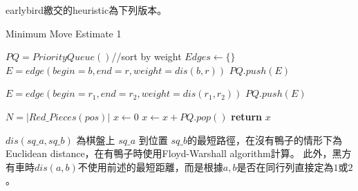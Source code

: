 \documentclass[a4paper, 12pt]{article}  %
\begin{document}
earlybird繳交的heuristic為下列版本。
\begin{algorithm}
\caption{Minimum Move Estimate 1}
\label{alg:min_move_estimate1}
    \begin{algorithmic}[1] %
        \State $PQ=PriorityQueue()$//sort by weight
        \State $Edges\gets \{\}$
                    \State$E=edge(begin=b,end=r,weight=dis(b,r))$
                    \State$PQ.push( E )$
                \EndIf
            \EndFor
        \EndFor


                \State$E=edge(begin=r_1,end=r_2,weight=dis(r_1,r_2))$
                \State$PQ.push( E )$
            \EndFor
        \EndFor
        
        \State$N = |Red\_Pieces(pos)|$
        \State $x\gets 0$
            \State $x\gets x + PQ.pop()$
        \EndFor
        \State\textbf{return} $x$
        \EndProcedure
    \end{algorithmic}
\end{algorithm}
$dis(sq\_a, sq\_b)$ 為棋盤上 $sq\_a$ 到位置 $sq\_b$的最短路徑，在沒有鴨子的情形下為Euclidean distance，在有鴨子時使用Floyd-Warshall algorithm計算。
此外，黑方有車時$dis(a,b)$不使用前述的最短距離，而是根據$a,b$是否在同行列直接定為$1$或$2$。\\
\end{document}
